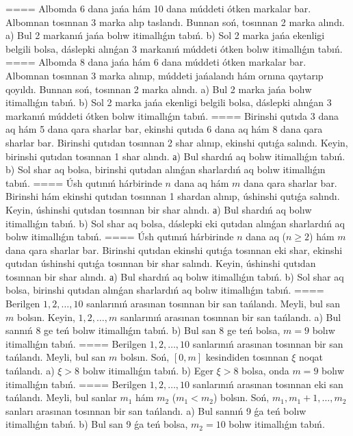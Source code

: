 ====
Albomda 6 dana jańa hám 10 dana múddeti ótken markalar bar. Albomnan tosınnan 3 marka alıp taslandı. Bunnan soń, tosınnan 2 marka alındı. a) Bul 2 markanıń jańa bolıw itimallıǵın tabıń. b) Sol 2 marka jańa ekenligi belgili bolsa, dáslepki alınǵan 3 markanıń múddeti ótken bolıw itimallıǵın tabıń.
====
Albomda 8 dana jańa hám 6 dana múddeti ótken markalar bar. Albomnan tosınnan 3 marka alınıp, múddeti jańalandı hám ornına qaytarıp qoyıldı. Bunnan soń, tosınnan 2 marka alındı. a) Bul 2 marka jańa bolıw itimallıǵın tabıń. b) Sol 2 marka jańa ekenligi belgili bolsa, dáslepki alınǵan 3 markanıń múddeti ótken bolıw itimallıǵın tabıń.
====
Birinshi qutıda 3 dana aq hám 5 dana qara sharlar bar, ekinshi qutıda 6 dana aq hám 8 dana qara sharlar bar. Birinshi qutıdan tosınnan 2 shar alınıp, ekinshi qutıǵa salındı. Keyin, birinshi qutıdan tosınnan 1 shar alındı. а) Bul shardıń aq bolıw itimallıǵın tabıń. b) Sol shar aq bolsa, birinshi qutıdan alınǵan sharlardıń aq bolıw itimallıǵın tabıń.
====
Úsh qutınıń hárbirinde $n$ dana aq hám $m$ dana qara sharlar bar. Birinshi hám ekinshi qutıdan tosınnan 1 shardan alınıp, úshinshi qutıǵa salındı. Keyin, úshinshi qutıdan tosınnan bir shar alındı. а) Bul shardıń aq bolıw itimallıǵın tabıń. b) Sol shar aq bolsa, dáslepki eki qutıdan alınǵan sharlardıń aq bolıw itimallıǵın tabıń.
====
Úsh qutınıń hárbirinde $n$ dana aq ($n\ge 2$) hám $m$ dana qara sharlar bar. Birinshi qutıdan ekinshi qutıǵa tosınnan eki shar, ekinshi qutıdan úshinshi qutıǵa tosınnan bir shar salındı. Keyin, úshinshi qutıdan tosınnan bir shar alındı. а) Bul shardıń aq bolıw itimallıǵın tabıń. b) Sol shar aq bolsa, birinshi qutıdan alınǵan sharlardıń aq bolıw itimallıǵın tabıń.
====
Berilgen $1,2,\ldots ,10$ sanlarınıń arasınan tosınnan bir san tańlandı. Meyli, bul san $m$ bolsın. Keyin, $1,2,\ldots ,m$ sanlarınıń arasınan tosınnan bir san tańlandı. a) Bul sannıń 8 ge teń bolıw itimallıǵın tabıń. b) Bul san 8 ge teń bolsa, $m=9$ bolıw itimallıǵın tabıń.
====
Berilgen $1,2,\ldots ,10$ sanlarınıń arasınan tosınnan bir san tańlandı. Meyli, bul san $m$ bolsın. Soń, $\left[ 0,m \right]$ kesindiden tosınnan $\xi $ noqat tańlandı. a) $\xi >8$ bolıw itimallıǵın tabıń. b) Eger $\xi >8$ bolsa, onda $m=9$ bolıw itimallıǵın tabıń.
====
Berilgen $1,2,\ldots ,10$ sanlarınıń arasınan tosınnan eki san tańlandı. Meyli, bul sanlar ${{m}_{1}}$ hám ${{m}_{2}}$ (${{m}_{1}}<{{m}_{2}}$) bolsın. Soń, ${{m}_{1}},{{m}_{1}}+1,\ldots ,{{m}_{2}}$ sanları arasınan tosınnan bir san tańlandı. a) Bul sannıń 9 ǵa teń bolıw itimallıǵın tabıń. b) Bul san 9 ǵa teń bolsa, ${{m}_{2}}=10$ bolıw itimallıǵın tabıń.
